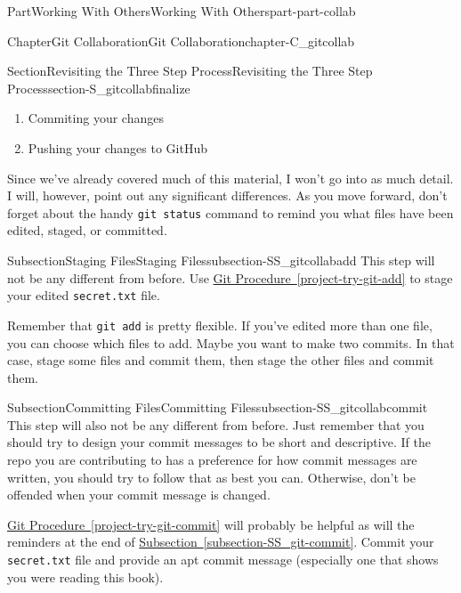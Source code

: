 \documentclass[oneside,10pt,]{book}
\newcommand{\xreffont}{\relax}
\newcommand{\mono}[1]{\texttt{#1}}
\begin{document}
\begin{partptx}{Part}{Working With Others}{}{Working With Others}{}{}{part-part-collab}
\begin{chapterptx}{Chapter}{Git Collaboration}{}{Git Collaboration}{}{}{chapter-C_gitcollab}
\begin{sectionptx}{Section}{Revisiting the Three Step Process}{}{Revisiting the Three Step Process}{}{}{section-S_gitcollabfinalize}
\begin{introduction}{}
\begin{enumerate}
\item{}Commiting your changes%
\item{}Pushing your changes to GitHub%
\end{enumerate}
%
\par
Since we've already covered much of this material, I won't go into as much detail. I will, however, point out any significant differences. As you move forward, don't forget about the handy \mono{git status} command to remind you what files have been edited, staged, or committed.%
\end{introduction}%
%
%
\typeout{************************************************}
\typeout{************************************************}
%
\begin{subsectionptx}{Subsection}{Staging Files}{}{Staging Files}{}{}{subsection-SS_gitcollabadd}
%
%
This step will not be any different from before. Use \hyperref[project-try-git-add]{Git Procedure~{\xreffont\ref{project-try-git-add}}} to stage your edited \mono{secret.txt} file.%
\par
Remember that \mono{git add} is pretty flexible. If you've edited more than one file, you can choose which files to add. Maybe you want to make two commits. In that case, stage some files and commit them, then stage the other files and commit them.%
\end{subsectionptx}
%
%
\typeout{************************************************}
\typeout{************************************************}
%
\begin{subsectionptx}{Subsection}{Committing Files}{}{Committing Files}{}{}{subsection-SS_gitcollabcommit}
%
%
This step will also not be any different from before. Just remember that you should try to design your commit messages to be short and descriptive. If the repo you are contributing to has a preference for how commit messages are written, you should try to follow that as best you can. Otherwise, don't be offended when your commit message is changed.%
\par
\hyperref[project-try-git-commit]{Git Procedure~{\xreffont\ref{project-try-git-commit}}} will probably be helpful as will the reminders at the end of \hyperref[subsection-SS_git-commit]{Subsection~{\xreffont\ref{subsection-SS_git-commit}}}. Commit your \mono{secret.txt} file and provide an apt commit message (especially one that shows you were reading this book).%
\end{subsectionptx}

\end{sectionptx}
\end{chapterptx}
\end{partptx}
\end{document}
